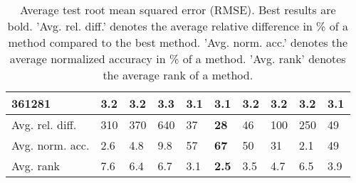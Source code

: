 \begin{table}[ht!]
\begin{tabular}{llllllllll}
  361281 & 3.2 & 3.2 & 3.3 & \textbf{3.1} & \textbf{3.1} & 3.2 & 3.2 & 3.2 & \textbf{3.1} \\ 
   \hline
Avg. rel. diff. & 310 & 370 & 640 & 37 & \textbf{28} & 46 & 100 & 250 & 49 \\ 
  Avg. norm. acc. & 2.6 & 4.8 & 9.8 & 57 & \textbf{67} & 50 & 31 & 2.1 & 49 \\ 
  Avg. rank & 7.6 & 6.4 & 6.7 & 3.1 & \textbf{2.5} & 3.5 & 4.7 & 6.5 & 3.9 \\ 
   \hline
\hline
\end{tabular}
\endgroup
\caption{Average test root mean squared error (RMSE). 
                  Best results are bold. 
                  'Avg. rel. diff.' denotes the average relative difference in \% of a method compared to the best method.
                  'Avg. norm. acc.' denotes the average normalized accuracy in \% of a method.
                  'Avg. rank' denotes the average rank of a method.} 
\label{table_results_RMSE}
\end{table}
